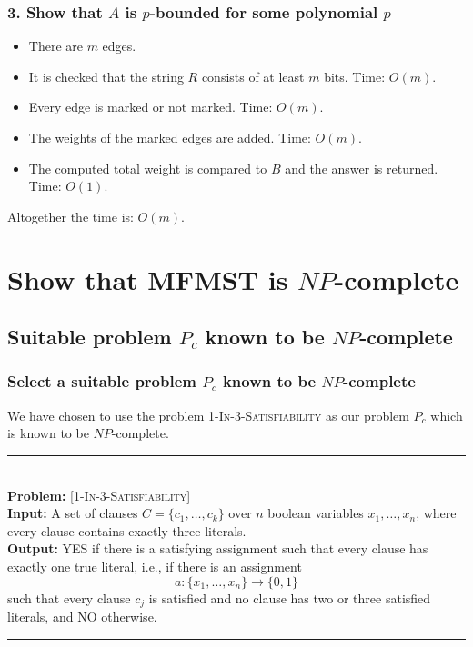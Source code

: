 \documentclass[12pt]{report}
\newcommand{\HRule}{\rule{\linewidth}{0.075mm}}
\begin{document}
\subsubsection{3. Show that $A$ is $p$-bounded for some polynomial $p$}
\begin{itemize}
	\item[] There are $m$ edges.
	
	\item[] It is checked that the string $R$ consists of at least $m$ bits. Time: $O(m)$.
	
	\item[] Every edge is marked or not marked. Time: $O(m)$.
	
	\item[] The weights of the marked edges are added. Time: $O(m)$.
	
	\item[] The computed total weight is compared to $B$ and the answer is returned. Time: $O(1)$.
\end{itemize}

Altogether the time is: $O(m)$.

\section{Show that MFMST is $NP$-complete}
\subsection{Suitable problem $P_c$ known to be $NP$-complete}
\subsubsection{Select a suitable problem $P_c$ known to be $NP$-complete}
We have chosen to use the problem \textsc{1-In-3-Satisfiability} as our problem $P_c$ which is known to be $NP$-complete.\\
\HRule\\
\textbf{Problem:} \textsc{[1-In-3-Satisfiability]}\\
\textbf{Input:} A set of clauses $C = \{c_1,\dots,c_k\}$ over $n$ boolean variables $x_1,\dots,x_n$, where every clause contains exactly three literals.\\
\textbf{Output:} YES if there is a satisfying assignment such that every clause has exactly one true literal, i.e., if there is an assignment
$$a: \{x_1,\dots,x_n\} \rightarrow \{0,1\}$$
such that every clause $c_j$ is satisfied and no clause has two or three satisfied literals, and NO otherwise.\\
\HRule
\end{document}
